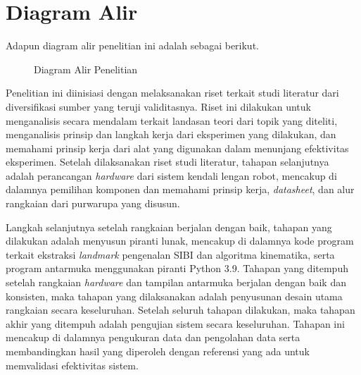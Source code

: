 \section{Diagram Alir}
Adapun diagram alir penelitian ini adalah sebagai berikut.

\begin{figure}[htbp]
\centering
{}
\caption{Diagram Alir Penelitian}
\label{fig:diagram_alir}
\end{figure}

Penelitian ini diinisiasi dengan melaksanakan riset terkait studi literatur dari diversifikasi sumber yang teruji validitasnya. Riset ini dilakukan untuk menganalisis secara mendalam terkait landasan teori dari topik yang diteliti, menganalisis prinsip dan langkah kerja dari eksperimen yang dilakukan, dan memahami prinsip kerja dari alat yang digunakan dalam menunjang efektivitas eksperimen. Setelah dilaksanakan riset studi literatur, tahapan selanjutnya adalah perancangan \textit{hardware} dari sistem kendali lengan robot, mencakup di dalamnya pemilihan komponen dan memahami prinsip kerja, \textit{datasheet}, dan alur rangkaian dari purwarupa yang disusun.

Langkah selanjutnya setelah rangkaian berjalan dengan baik, tahapan yang dilakukan adalah menyusun piranti lunak, mencakup di dalamnya kode program terkait ekstraksi \textit{landmark} pengenalan SIBI dan algoritma kinematika, serta program antarmuka menggunakan piranti Python 3.9. Tahapan yang ditempuh setelah rangkaian \textit{hardware} dan tampilan antarmuka berjalan dengan baik dan konsisten, maka tahapan yang dilaksanakan adalah penyusunan desain utama rangkaian secara keseluruhan. Setelah seluruh tahapan dilakukan, maka tahapan akhir yang ditempuh adalah pengujian sistem secara keseluruhan. Tahapan ini mencakup di dalamnya pengukuran data dan pengolahan data serta membandingkan hasil yang diperoleh dengan referensi yang ada untuk memvalidasi efektivitas sistem.

